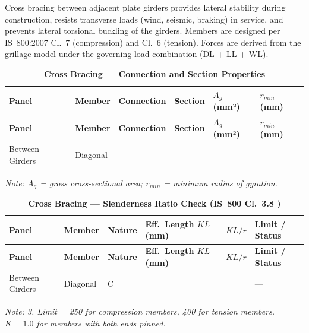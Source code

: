 \documentclass[12pt,a4paper]{report}
\numberwithin{table}{chapter}
\numberwithin{figure}{chapter}
\newcommand{\ReportCompactTable}{\setlength{\tabcolsep}{2pt}}
\newcommand{\ReportTableGap}{\vspace{1em}}
\newcommand{\ReportMinorGap}{\vspace{0.4em}}
\newcommand{\ReportTableLeft}{\setlength{\LTleft}{0pt}\setlength{\LTright}{\fill}}
\begin{document}
Cross bracing between adjacent plate girders provides lateral stability during construction, resists transverse loads (wind, seismic, braking) in service, and prevents lateral torsional buckling of the girders. Members are designed per IS~800:2007 Cl.~7 (compression) and Cl.~6 (tension). Forces are derived from the grillage model under the governing load combination  (DL + LL + WL).

\ReportTableGap

\ReportMinorGap
\noindent
\ReportCompactTable
\ReportTableLeft

\begin{longtable}{|C{2.0cm}|L{2.0cm}|L{2.2cm}|C{2.5cm}|C{2.0cm}|C{2.0cm}|}
\caption{\textbf{Cross Bracing --- Connection and Section Properties}}\\
\hline
\textbf{Panel} & \textbf{Member} & \textbf{Connection} & \textbf{Section} & \textbf{$A_g$ (mm²)} & \textbf{$r_{min}$ (mm)} \\[6pt]
\hline
\endfirsthead
\hline
\textbf{Panel} & \textbf{Member} & \textbf{Connection} & \textbf{Section} & \textbf{$A_g$ (mm²)} & \textbf{$r_{min}$ (mm)} \\[6pt]
\hline
\endhead

Between Girders & Diagonal &  &  &  &  \\[6pt]
\hline
\end{longtable}
\noindent\textit{Note: $A_g$ = gross cross-sectional area; $r_{min}$ = minimum radius of gyration.}

\ReportTableGap
\begin{longtable}{|C{2.2cm}|L{2.2cm}|L{2.5cm}|C{2.5cm}|C{2.5cm}|>{\centering\arraybackslash}p{3.6cm}|}
\caption{\textbf{Cross Bracing --- Slenderness Ratio Check (IS~800 Cl.~3.8 )}}\\
\hline
\textbf{Panel} & \textbf{Member} & \textbf{Nature} & \textbf{Eff.\ Length $KL$ (mm)} & \textbf{$KL/r$} & \textbf{Limit / Status} \\[6pt]
\hline
\endfirsthead
\hline
\textbf{Panel} & \textbf{Member} & \textbf{Nature} & \textbf{Eff.\ Length $KL$ (mm)} & \textbf{$KL/r$} & \textbf{Limit / Status} \\[6pt]
\hline
\endhead

Between Girders & Diagonal & C &  &  &  ---  \\[6pt]
\hline
\end{longtable}
\noindent\textit{Note:  3. Limit = 250 for compression members, 400 for tension members. $K = 1.0$ for members with both ends pinned.}
\end{document}
